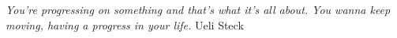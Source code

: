 \thispagestyle{empty}
\vspace*{\fill}
\emph{
    You're progressing on something and that's what it's all about. You wanna keep moving, having a progress in your life.
}
\hfill Ueli Steck
\vspace*{\fill}



